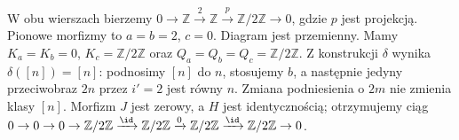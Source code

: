 \begin{przyklad}\label{cat:ex:snake-nonzero}
W obu wierszach bierzemy $0\to\mathbb Z\xrightarrow{2}\mathbb Z\xrightarrow{p}\mathbb Z/2\mathbb Z\to0$, gdzie $p$ jest projekcją. Pionowe morfizmy to $a=b=2$, $c=0$. Diagram jest przemienny. Mamy $K_a=K_b=0$, $K_c=\mathbb Z/2\mathbb Z$ oraz $Q_a=Q_b=Q_c=\mathbb Z/2\mathbb Z$. Z konstrukcji $\delta$ wynika $\delta([n])=[n]$: podnosimy $[n]$ do $n$, stosujemy $b$, a następnie jedyny przeciwobraz $2n$ przez $i'=2$ jest równy $n$. Zmiana podniesienia o $2m$ nie zmienia klasy $[n]$. Morfizm $J$ jest zerowy, a $H$ jest identycznością; otrzymujemy ciąg $0\to0\to0\to\mathbb Z/2\mathbb Z\xrightarrow{\id}\mathbb Z/2\mathbb Z\xrightarrow{0}\mathbb Z/2\mathbb Z\xrightarrow{\id}\mathbb Z/2\mathbb Z\to0$.
\end{przyklad}

